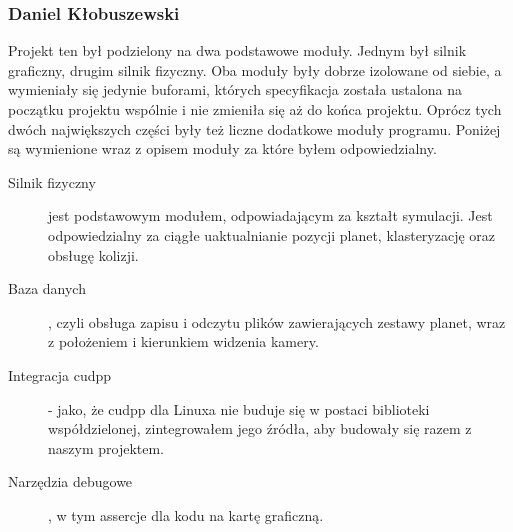 \subsubsection{Daniel Kłobuszewski}\label{ssub:daniel klobuszewski}

Projekt ten był podzielony na dwa podstawowe moduły. Jednym był silnik graficzny, drugim silnik fizyczny. Oba moduły były dobrze izolowane od siebie, a wymieniały się jedynie buforami, których specyfikacja została ustalona na początku projektu wspólnie i nie zmieniła się aż do końca projektu. Oprócz tych dwóch największych części były też liczne dodatkowe moduły programu. Poniżej są wymienione wraz z opisem moduły za które byłem odpowiedzialny.

\begin{description}
\item[Silnik fizyczny] jest podstawowym modułem, odpowiadającym za kształt symulacji. Jest odpowiedzialny za ciągłe uaktualnianie pozycji planet, klasteryzację oraz obsługę kolizji.
\item[Baza danych], czyli obsługa zapisu i odczytu plików zawierających zestawy planet, wraz z położeniem i kierunkiem widzenia kamery.
\item[Integracja cudpp] - jako, że cudpp dla Linuxa nie buduje się w postaci biblioteki współdzielonej, zintegrowałem jego źródła, aby budowały się razem z naszym projektem.
\item[Narzędzia debugowe], w tym assercje dla kodu na kartę graficzną.
\end{description}
